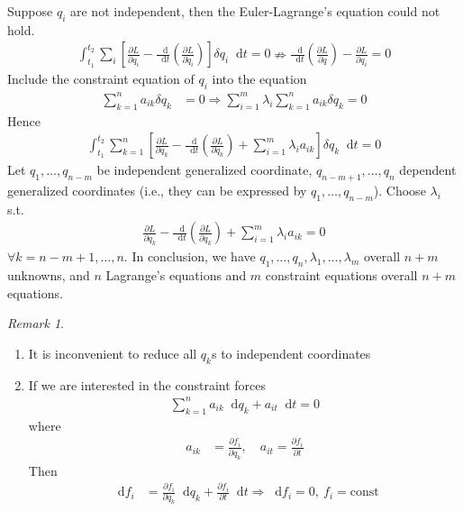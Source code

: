 \documentclass[twoside,9pt]{article}
\numberwithin{equation}{section} %
\renewcommand*\d{\mathop{}\!\mathrm{d}}
\theoremstyle{definition}
\theoremstyle{remark}
\newtheorem*{remark}{Remark}
\begin{document}
Suppose $q_i$ are not independent, then the Euler-Lagrange's equation
could not hold.
\begin{align*}
    \int_{t_1}^{t_2}\sum_i\left[
        \frac{\partial L}{\partial q_i}
        - \frac{\d}{\d t}\left(\frac{\partial L}{\partial\dot{q}_i}\right)
    \right]\delta q_i\d t = 0 
    \nRightarrow
    \frac{\d}{\d t}\left(\frac{\partial L}{\partial\dot{q}}\right)
    - \frac{\partial L}{\partial q_i} = 0
\end{align*}
Include the constraint equation of $q_i$ into the equation
\begin{align}
    \sum_{k=1}^n a_{ik}\delta q_k &= 0
    \Rightarrow
    \sum_{i=1}^m \lambda_i\sum_{k=1}^n a_{ik}\delta q_k = 0
\end{align}
Hence
\begin{align*}
    \int_{t_1}^{t_2}\sum_{k=1}^n\left[
        \frac{\partial L}{\partial q_k}
        - \frac{\d}{\d t}\left(\frac{\partial L}{\partial\dot{q}_k}\right)
        + \sum_{i=1}^m\lambda_i a_{ik}
    \right]\delta q_k\d t = 0 
\end{align*}
Let $q_1,\dots,q_{n-m}$ be independent generalized coordinate,
$q_{n-m+1},\dots,q_n$ dependent generalized coordinates (i.e., they can
be expressed by $q_1,\dots,q_{n-m}$).
Choose $\lambda_i$ s.t.
\begin{align}
    \frac{\partial L}{\partial q_k}
    - \frac{\d}{\d t}\left(\frac{\partial L}{\partial\dot{q}_k}\right)
    + \sum_{i=1}^m\lambda_i a_{ik}
    = 0
\end{align}
$\forall k = n-m+1,\dots,n$.
In conclusion, we have $q_1,\dots,q_n,\lambda_1,\dots,\lambda_m$ overall
$n+m$ unknowns, and $n$ Lagrange's equations and $m$ constraint equations
overall $n+m$ equations.
\begin{remark}\ 
\begin{enumerate}[label=\arabic*)]
\item It is inconvenient to reduce all $q_k$s to independent 
coordinates
\item If we are interested in the constraint forces
\begin{align*}
    \sum_{k=1}^n a_{ik}\d q_k + a_{it}\d t = 0
\end{align*}
where 
\begin{align*}
    a_{ik} &= \frac{\partial f_i}{\partial q_k},\quad
    a_{it} = \frac{\partial f_i}{\partial t}
\end{align*}
Then
\begin{align*}
    \d f_i &= \frac{\partial f_i}{\partial q_k}\d q_k + 
    \frac{\partial f_i}{\partial t}\d t
    \Rightarrow \d f_i = 0,~f_i=\text{const}
\end{align*}
\end{enumerate}
\end{remark}
\end{document}
